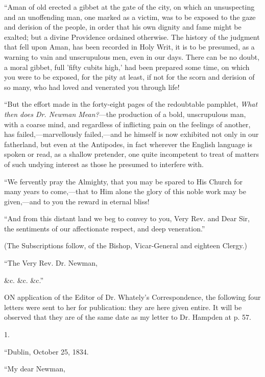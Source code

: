``Aman of old erected a gibbet at the gate of the city, on which
an unsuspecting and an unoffending man, one marked as a victim, was to
be exposed to the gaze and derision of the people, in order that his own
dignity and fame might be exalted; but a divine Providence ordained
otherwise. The history of the judgment that fell upon Aman, has been
recorded in Holy Writ, it is to be presumed, as a warning to vain and
unscrupulous men, even in our days. There can be no doubt, a moral
gibbet, full 'fifty cubits high,' had been prepared some time, on which
you were to be exposed, for the pity at least, if not for the scorn and
derision of so many, who had loved and venerated you through life!

``But the effort made in the forty-eight pages of the redoubtable
pamphlet, \emph{What then does Dr. Newman Mean?}—the production of a bold,
unscrupulous man, with a coarse mind, and regardless of inflicting pain
on the feelings of another, has failed,—marvellously failed,—and he
himself is now exhibited not only in our fatherland, but even at the
Antipodes, in fact wherever the English language is spoken or read, as a
shallow pretender, one quite incompetent to treat of matters of such
undying interest as those he presumed to interfere with.

``We fervently pray the Almighty, that you may be spared to His
Church for many years to come,—that to Him alone the glory of this
noble work may be given,—and to you the reward in eternal bliss!

``And from this distant land we beg to convey to you, Very Rev.
and Dear Sir, the sentiments of our affectionate respect, and deep
veneration.''

(The Subscriptions follow, of the Bishop, Vicar-General and eighteen
Clergy.)

``The Very Rev. Dr. Newman,

\&c. \&c. \&c.''



ON
application of the Editor of Dr. Whately's Correspondence, the following
four letters were sent to her for publication: they are here given
entire. It will be observed that they are of the same date as my letter
to Dr. Hampden at p. 57.

1.

``Dublin, October 25, 1834.

``My dear Newman,


